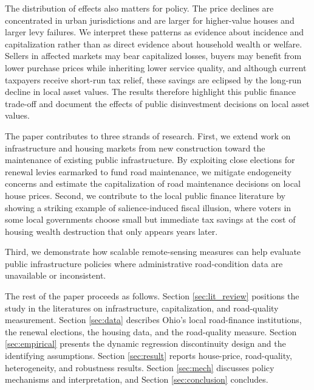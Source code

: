 The distribution of effects also matters for policy. The price declines are concentrated in urban jurisdictions and are larger for higher-value houses and larger levy failures. We interpret these patterns as evidence about incidence and capitalization rather than as direct evidence about household wealth or welfare. Sellers in affected markets may bear capitalized losses, buyers may benefit from lower purchase prices while inheriting lower service quality, and although current taxpayers receive short-run tax relief, these savings are eclipsed by the long-run decline in local asset values. The results therefore highlight this public finance trade-off and document the effects of public disinvestment decisions on local asset values.

The paper contributes to three strands of research. First, we extend work on infrastructure and housing markets from new construction toward the maintenance of existing public infrastructure. By exploiting close elections for renewal levies earmarked to fund road maintenance, we mitigate endogeneity concerns and estimate the capitalization of road maintenance decisions on local house prices. Second, we contribute to the local public finance literature by showing a striking example of salience-induced fiscal illusion, where voters in some local governments choose small but immediate tax savings at the cost of housing wealth destruction that only appears years later.

Third, we demonstrate how scalable remote-sensing measures can help evaluate public infrastructure policies where administrative road-condition data are unavailable or inconsistent.

The rest of the paper proceeds as follows. Section \ref{sec:lit_review} positions the study in the literatures on infrastructure, capitalization, and road-quality measurement. Section \ref{sec:data} describes Ohio's local road-finance institutions, the renewal elections, the housing data, and the road-quality measure. Section \ref{sec:empirical} presents the dynamic regression discontinuity design and the identifying assumptions. Section \ref{sec:result} reports house-price, road-quality, heterogeneity, and robustness results. Section \ref{sec:mech} discusses policy mechanisms and interpretation, and Section \ref{sec:conclusion} concludes.

